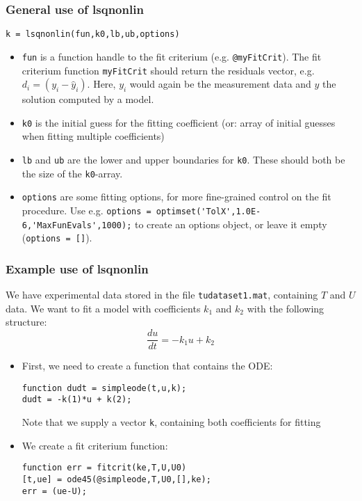 \begin{frame}[fragile] 
  \frametitle{General use of lsqnonlin}
  \begin{lstlisting}
k = lsqnonlin(fun,k0,lb,ub,options)
  \end{lstlisting}
  \begin{itemize}
    \item \lstinline$fun$ is a function handle to the fit criterium (e.g. \lstinline$@myFitCrit$). The fit criterium function \lstinline$myFitCrit$ should return the residuals vector, e.g. $d_i = \left(y_i - \hat{y}_i\right)$. 
  Here, $y_i$ would again be the measurement data and $\hat{y}$ the solution computed by a model.
  \item \lstinline$k0$ is the initial guess for the fitting coefficient (or: array of initial guesses when fitting multiple coefficients)
  \item \lstinline$lb$ and \lstinline$ub$ are the lower and upper boundaries for \lstinline$k0$. These should both be the size of the \lstinline$k0$-array.
  \item \lstinline$options$ are some fitting options, for more fine-grained control on the fit procedure. Use e.g. \lstinline$options = optimset('TolX',1.0E-6,'MaxFunEvals',1000);$ to create an options object, or leave it empty (\lstinline$options = []$).
  \end{itemize}  
\end{frame}

\begin{frame}[fragile] 
  \frametitle{Example use of lsqnonlin}
  We have experimental data stored in the file \lstinline$tudataset1.mat$, containing $T$ and $U$ data. We want to fit a model with coefficients $k_1$ and $k_2$ with the following structure:
  \[
    \frac{du}{dt} = -k_1 u + k_2
  \]
  \pause
  \begin{itemize}
    \item First, we need to create a function that contains the ODE:
    \begin{lstlisting}
function dudt = simpleode(t,u,k);
dudt = -k(1)*u + k(2);
    \end{lstlisting}
    Note that we supply a vector \lstinline$k$, containing both coefficients for fitting
    \pause
    \item We create a fit criterium function:
    \begin{lstlisting}
function err = fitcrit(ke,T,U,U0)
[t,ue] = ode45(@simpleode,T,U0,[],ke);
err = (ue-U);
    \end{lstlisting}
  \end{itemize}
\end{frame}

